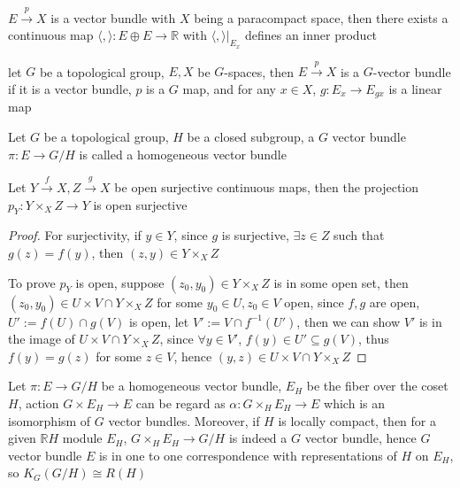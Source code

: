\documentclass[main]{subfiles}
\begin{document}
\begin{proposition}
$E\overset{p}{\rightarrow}X$ is a vector bundle with $X$ being a paracompact space, then there exists a continuous map $\langle,\rangle: E\oplus E\rightarrow\mathbb R$ with $\langle,\rangle|_{E_x}$ defines an inner product
\end{proposition}

\begin{definition}
let $G$ be a topological group, $E,X$ be $G$-spaces, then $E\xrightarrow{p}X$ is a $G$-vector bundle if it is a vector bundle, $p$ is a $G$ map, and for any $x\in X$, $g:E_x\to E_{gx}$ is a linear map
\end{definition}

\begin{definition}
Let $G$ be a topological group, $H$ be a closed subgroup, a $G$ vector bundle $\pi:E\to G/H$ is called a homogeneous vector bundle
\end{definition}

\begin{lemma}
Let $Y\xrightarrow{f}X,Z\xrightarrow{g}X$ be open surjective continuous maps, then the projection $p_Y:Y\times_X Z\to Y$ is open surjective
\end{lemma}

\begin{proof}
For surjectivity, if $y\in Y$, since $g$ is surjective, $\exists z\in Z$ such that $g(z)=f(y)$, then $(z,y)\in Y\times_X Z$ \par
To prove $p_Y$ is open, suppose $(z_0,y_0)\in Y\times_X Z$ is in some open set, then $(z_0,y_0)\in U\times V\cap Y\times_X Z$ for some $y_0\in U,z_0\in V$ open, since $f,g$ are open, $U':=f(U)\cap g(V)$ is open, let $V':=V\cap f^{-1}(U')$, then we can show $V'$ is in the image of $U\times V\cap Y\times_X Z$, since $\forall y\in V'$, $f(y)\in U'\subseteq g(V)$, thus $f(y)=g(z)$ for some $z\in V$, hence $(y,z)\in U\times V\cap Y\times_X Z$
\end{proof}

\begin{proposition}
Let $\pi:E\to G/H$ be a homogeneous vector bundle, $E_H$ be the fiber over the coset $H$, action $G\times E_H\to E$ can be regard as $\alpha: G\times_H E_H\to E$ which is an isomorphism of $G$ vector bundles. Moreover, if $H$ is locally compact, then for a given $\mathbb RH$ module $E_H$, $G\times_H E_H\to G/H$ is indeed a $G$ vector bundle, hence $G$ vector bundle $E$ is in one to one correspondence with representations of $H$ on $E_H$, so $K_G(G/H)\cong R(H)$
\end{proposition}
\end{document}
